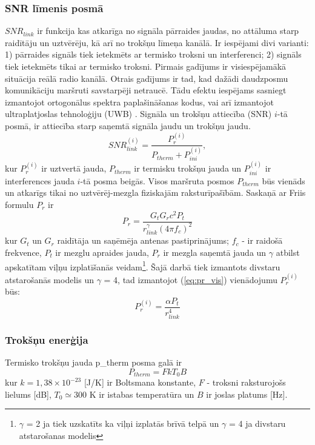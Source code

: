 \subsubsection{SNR līmenis posmā}
$SNR_{link}$  ir funkcija kas atkarīga no signāla pārraides jaudas, no attāluma starp raidītāju un uztvērēju, kā arī no trokšņu līmeņa kanālā. Ir iespējami divi varianti: 1) pārraides signāls tiek ietekmēts ar termisko troksni un interferenci; 2) signāls tiek ietekmēts tikai ar termisko troksni. Pirmais gadījums ir visiespējamākā situācija reālā radio kanālā. Otrais gadījums ir tad, kad dažādi daudzposmu komunikāciju maršruti savstarpēji netraucē. Tādu efektu iespējams sasniegt izmantojot ortogonālus spektra paplašināšanas kodus, vai arī izmantojot ultraplatjoslas tehnoloģiju (\acs{UWB}) \cite{qoS_mobility}. Signāla un trokšņu attiecība (\acs{SNR}) $i$-tā posmā, ir attiecība starp saņemtā signāla jaudu un trokšņu jaudu.
\begin{equation}
 SNR_{link}^{(i)}=\frac{P_{r}^{(i)}}{P_{therm}+P_{ini}^{(i)}},
\label{eq:snr}
\end{equation}
kur $P_{r}^{(i)}$ ir uztvertā jauda,  $P_{therm}$ ir termisku trokšņu jauda un $P_{ini}^{(i)}$ ir interferences jauda $i$-tā posma beigās. Visos maršruta posmos $P_{therm}$ būs vienāds un atkarīgs tikai no uztvērēj-mezgla fiziskajām raksturīpašībām. Saskaņā ar Friis formulu $P_{r}$ ir \cite{22}
\begin{equation}
 P_{r}=\frac{G_{t}G_{r}c^{2}P_{t}}{r_{link}^{\gamma}(4\pi f_{c})^2}
\label{eq:pr_vis}
\end{equation}
kur $G_{t}$ un $G_{r}$ raidītāja un saņēmēja antenas pastiprinājums; $f_{c}$ - ir raidošā frekvence, $P_{t}$ ir mezglu apraides jauda,  $P_{r}$ ir mezgla saņemtā jauda un $\gamma$ atbilst apskatītam viļņu izplatīšanās veidam\footnote{$\gamma$ = 2 ja tiek uzskatīts ka viļņi izplatās brīvā telpā un $\gamma$ = 4 ja divstaru atstarošanas modelis}. Šajā darbā tiek izmantots divstaru atstarošanās modelis un $\gamma$ = 4, tad izmantojot (\ref{eq:pr_vis}) vienādojumu $P_{r}^{(i)}$ būs:
\begin{equation}
 P_{r}^{(i)}=\frac{\alpha P_{t}}{r_{link}^{4}}
\label{eq:pr}
\end{equation}

\subsubsection{Trokšņu enerģija}
 Termisko trokšņu jauda \gls{p_therm} posma galā ir
\begin{equation}
 P_{therm}=FkT_{0}B
\end{equation}
kur $k = 1,38\times10^{-23}$ [J/K] ir Boltsmana konstante, $F$ - troksni raksturojošs lielums [dB], $T_{0}\simeq 300$ K ir istabas temperatūra un $B$ ir joslas platums [Hz].

